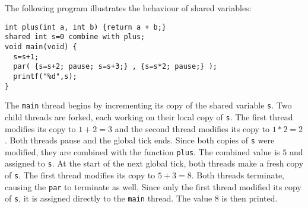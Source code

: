 The following program illustrates the behaviour of shared variables:
\begin{lstlisting}[style=snippet]
int plus(int a, int b) {return a + b;}
shared int s=0 combine with plus;
void main(void) {
  s=s+1;
  par( {s=s+2; pause; s=s+3;} , {s=s*2; pause;} );
  printf("%d",s);
}
\end{lstlisting}
The \verb$main$ thread begins by incrementing its copy of the shared 
variable \verb$s$. Two child threads are forked, each working on their 
local copy of \verb$s$. The first thread modifies its copy to $1+2 = 3$ 
and the second thread modifies its copy to $1*2 = 2$. Both 
threads pause and the global tick ends. Since 
both copies of \verb$s$ were modified, they are combined with 
the function \verb$plus$. The combined 
value is $5$ and assigned to \verb$s$. At the start of the 
next global tick, both threads make a fresh copy of \verb$s$.
The first thread modifies its copy to $5+3 = 8$. Both 
threads terminate, causing the \verb$par$ to terminate as well. 
Since only the first thread modified its copy of \verb$s$, it is 
assigned directly to the \verb$main$ thread. The value $8$ is 
then printed.

